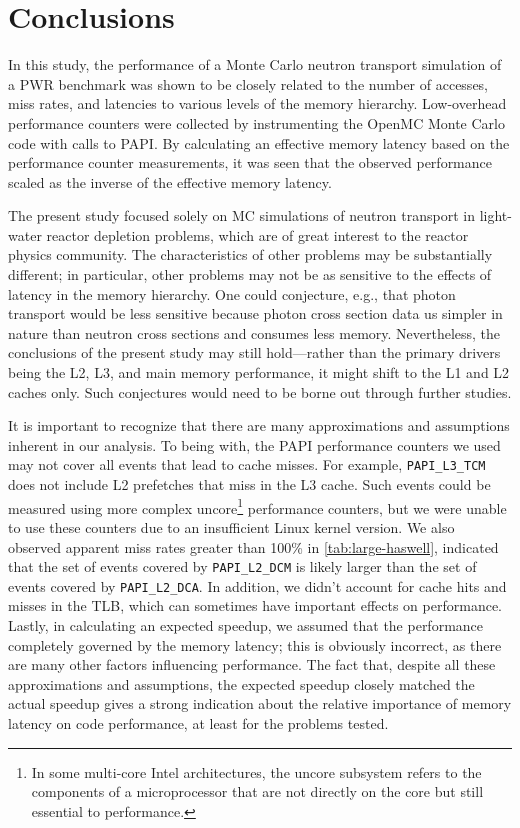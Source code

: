\documentclass{mc2015}
\begin{document}
\section{Conclusions}

In this study, the performance of a Monte Carlo neutron transport simulation of
a PWR benchmark was shown to be closely related to the number of accesses, miss
rates, and latencies to various levels of the memory hierarchy. Low-overhead
performance counters were collected by instrumenting the OpenMC Monte Carlo code
with calls to PAPI. By calculating an effective memory latency based on the
performance counter measurements, it was seen that the observed performance
scaled as the inverse of the effective memory latency.

The present study focused solely on MC simulations of neutron transport in
light-water reactor depletion problems, which are of great interest to the
reactor physics community. The characteristics of other problems may be
substantially different; in particular, other problems may not be as sensitive
to the effects of latency in the memory hierarchy. One could conjecture, e.g.,
that photon transport would be less sensitive because photon cross section data
us simpler in nature than neutron cross sections and consumes less
memory. Nevertheless, the conclusions of the present study may still
hold---rather than the primary drivers being the L2, L3, and main memory
performance, it might shift to the L1 and L2 caches only. Such conjectures would
need to be borne out through further studies.

It is important to recognize that there are many approximations and assumptions
inherent in our analysis. To being with, the PAPI performance counters we used
may not cover all events that lead to cache misses. For example,
\texttt{PAPI\_L3\_TCM} does not include L2 prefetches that miss in the L3
cache. Such events could be measured using more complex uncore\footnote{In some
  multi-core Intel architectures, the uncore subsystem refers to the components
  of a microprocessor that are not directly on the core but still essential to
  performance.} performance counters, but we were unable to use these counters
due to an insufficient Linux kernel version. We also observed apparent miss
rates greater than 100\% in \autoref{tab:large-haswell}, indicated that the set
of events covered by \texttt{PAPI\_L2\_DCM} is likely larger than the set of
events covered by \texttt{PAPI\_L2\_DCA}. In addition, we didn't account for
cache hits and misses in the TLB, which can sometimes have important effects on
performance. Lastly, in calculating an expected speedup, we assumed that the
performance completely governed by the memory latency; this is obviously
incorrect, as there are many other factors influencing performance. The fact
that, despite all these approximations and assumptions, the expected speedup
closely matched the actual speedup gives a strong indication about the relative
importance of memory latency on code performance, at least for the problems
tested.
\end{document}
